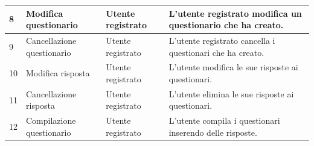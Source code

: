 \documentclass[12pt]{article}
\begin{document}
\begin{table}[H]
\begin{adjustbox}{max width=1.1\textwidth,center}
\begin{tabular}{llll}
				\multicolumn{1}{|l|}{8}                                                          & \multicolumn{1}{l|}{Modifica questionario}                                                                    & \multicolumn{1}{l|}{Utente registrato}                                                                 & \multicolumn{1}{l|}{L'utente registrato modifica un questionario che ha creato.}                                                                                                                       \\ \hline
				\multicolumn{1}{|l|}{9}                                                          & \multicolumn{1}{l|}{Cancellazione questionario}                                                               & \multicolumn{1}{l|}{Utente registrato}                                                                 & \multicolumn{1}{l|}{L'utente registrato cancella i questionari che ha creato.}                                                                                                                         \\ \hline
				\multicolumn{1}{|l|}{10}                                                         & \multicolumn{1}{l|}{Modifica risposta}                                                                        & \multicolumn{1}{l|}{Utente registrato}                                                                 & \multicolumn{1}{l|}{L'utente modifica le sue risposte ai questionari.}                                                                                                                                 \\ \hline
				\multicolumn{1}{|l|}{11}                                                         & \multicolumn{1}{l|}{Cancellazione risposta}                                                                   & \multicolumn{1}{l|}{Utente registrato}                                                                 & \multicolumn{1}{l|}{L'utente elimina le sue risposte ai questionari.}                                                                                                                                  \\ \hline
				\multicolumn{1}{|l|}{12}                                                         & \multicolumn{1}{l|}{Compilazione questionario}                                                                & \multicolumn{1}{l|}{Utente registrato}                                                                 & \multicolumn{1}{l|}{L'utente compila i questionari inserendo delle risposte.}                                                                                                                          \\ \hline

\end{tabular}
\end{adjustbox}
\end{table}
\end{document}
